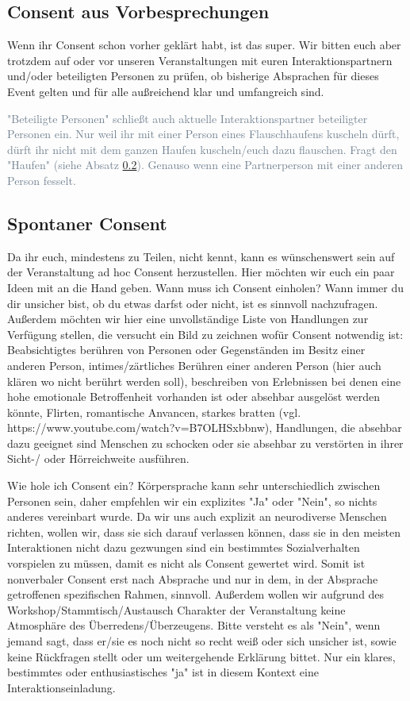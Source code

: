 \documentclass{article}
\begin{document}
\subsection{Consent aus Vorbesprechungen}
Wenn ihr Consent schon vorher geklärt habt, ist das super. Wir bitten euch aber trotzdem auf oder vor unseren Veranstaltungen mit euren Interaktionspartnern und/oder beteiligten Personen zu prüfen, ob bisherige Absprachen für dieses Event gelten und für alle außreichend klar und umfangreich sind. 

\begingroup{}
\textcolor{SlateGrey}{"Beteiligte Personen" schließt auch aktuelle Interaktionspartner beteiligter Personen ein. Nur weil ihr mit einer Person eines Flauschhaufens kuscheln dürft, dürft ihr nicht mit dem ganzen Haufen kuscheln/euch dazu flauschen. Fragt den "Haufen" (siehe Absatz \ref{sponcon}). Genauso wenn eine Partnerperson mit einer anderen Person fesselt.}

\endgroup

\subsection{Spontaner Consent}
\label{sponcon}
Da ihr euch, mindestens zu Teilen, nicht kennt, kann es wünschenswert sein auf der Veranstaltung ad hoc Consent herzustellen. Hier möchten wir euch ein paar Ideen mit an die Hand geben. Wann muss ich Consent einholen? Wann immer du dir unsicher bist, ob du etwas darfst oder nicht, ist es sinnvoll nachzufragen. Außerdem möchten wir hier eine unvollständige Liste von Handlungen zur Verfügung stellen, die versucht ein Bild zu zeichnen wofür Consent notwendig ist:
Beabsichtigtes berühren von Personen oder Gegenständen im Besitz einer anderen Person, intimes/zärtliches Berühren einer anderen Person (hier auch klären wo nicht berührt werden soll), beschreiben von Erlebnissen bei denen eine hohe emotionale Betroffenheit vorhanden ist oder absehbar ausgelöst werden könnte, Flirten, romantische Anvancen, starkes bratten (vgl. https://www.youtube.com/watch?v=B7OLHSxbbnw), Handlungen, die absehbar dazu geeignet sind Menschen zu schocken oder sie absehbar zu verstörten in ihrer Sicht-/ oder Hörreichweite ausführen.


Wie hole ich Consent ein? Körpersprache kann sehr unterschiedlich zwischen Personen sein, daher empfehlen wir ein explizites "Ja" oder "Nein", so nichts anderes vereinbart wurde. Da wir uns auch explizit an neurodiverse Menschen richten, wollen wir, dass sie sich darauf verlassen können, dass sie in den meisten Interaktionen nicht dazu gezwungen sind ein bestimmtes Sozialverhalten vorspielen zu müssen, damit es nicht als Consent gewertet wird. Somit ist nonverbaler Consent erst nach Absprache und nur in dem, in der Absprache getroffenen spezifischen Rahmen, sinnvoll. Außerdem wollen wir aufgrund des Workshop/Stammtisch/Austausch Charakter der Veranstaltung keine Atmosphäre des Überredens/Überzeugens. Bitte versteht es als "Nein", wenn jemand sagt, dass er/sie es noch nicht so recht weiß oder sich unsicher ist, sowie keine Rückfragen stellt oder um weitergehende Erklärung bittet. Nur ein klares, bestimmtes oder enthusiastisches "ja" ist in diesem Kontext eine Interaktionseinladung.
\end{document}
